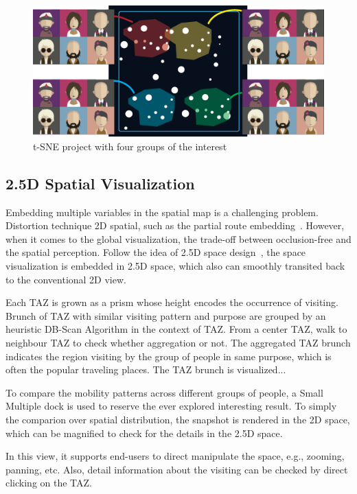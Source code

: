 \begin{figure}[htb!]
 \centering %
 \includegraphics[width=\columnwidth]{pictures/mds}
 \caption{t-SNE project with four groups of the interest}
 \label{fig:tsne}
\end{figure}

\subsection{2.5D Spatial Visualization}

Embedding multiple variables in the spatial map is a challenging problem. Distortion technique 2D spatial, such as the partial route embedding~\cite{sun2016embedding}. However, when it comes to the global visualization, the trade-off between occlusion-free and the spatial perception. Follow the idea of 2.5D space design~\cite{Tominski2012_stacking}, the space visualization is embedded in 2.5D space, which also can smoothly transited back to the conventional 2D view.  

 Each TAZ is grown as a prism whose height encodes the occurrence of visiting. Brunch of TAZ with similar visiting pattern and purpose are grouped by an heuristic DB-Scan Algorithm in the context of TAZ. From a center TAZ, walk to neighbour TAZ to check whether aggregation or not. The aggregated TAZ brunch indicates the region visiting by the group of people in same purpose, which is often the popular traveling places. The TAZ brunch is visualized...

 To compare the mobility patterns across different groups of people, a Small Multiple dock is used to reserve the ever explored interesting result. To simply the comparion over spatial distribution, the snapshot is rendered in the 2D space, which can be magnified to check for the details in the 2.5D space.

 In this view, it supports end-users to direct manipulate the space, e.g., zooming, panning, etc. Also, detail information about the visiting can be checked by direct clicking on the TAZ. 